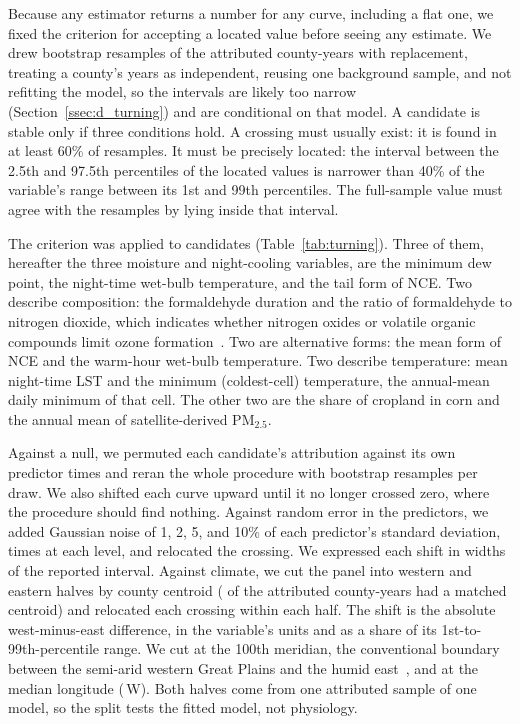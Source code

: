 \documentclass[sensors,article,submit,moreauthors,pdftex]{Definitions/mdpi}
\begin{document}
Because any estimator returns a number for any curve, including a flat one,
we fixed the criterion for accepting a located value before seeing any
estimate. We drew \TpBoot{} bootstrap resamples of the attributed county-years
with replacement, treating a county's years as independent, reusing one background sample, and not refitting the model, so the intervals are likely too narrow (Section~\ref{ssec:d_turning}) and are
conditional on that model. A candidate is stable only if three conditions
hold. A crossing
must usually exist: it is found in at least 60\% of resamples. It must be
precisely located: the interval between the 2.5th and 97.5th percentiles of the
located values is narrower than 40\% of the variable's range between its 1st
and 99th percentiles. The
full-sample value must agree with the resamples by lying inside that interval.

The criterion was applied to \TpTotal{} candidates
(Table~\ref{tab:turning}). Three of them, hereafter the three moisture
and night-cooling variables, are the minimum dew point, the night-time
wet-bulb temperature, and the tail form of NCE. Two describe composition: the
formaldehyde duration and the ratio of formaldehyde to nitrogen dioxide, which
indicates whether nitrogen oxides or volatile organic compounds limit ozone
formation~\cite{Duncan2010}. Two are alternative forms: the mean form of NCE
and the warm-hour wet-bulb temperature. Two describe temperature: mean
night-time LST and the minimum (coldest-cell) temperature, the annual-mean
daily minimum of that cell. The other two are the share of cropland in corn and the annual
mean of satellite-derived PM$_{2.5}$.

Against a null, we permuted each
candidate's attribution against its own predictor \NullCrossDraws{} times and
reran the whole procedure with \NullCrossBoot{} bootstrap resamples per draw.
We also shifted each curve upward until it no longer crossed zero, where the
procedure should find nothing. Against random error in the predictors, we added Gaussian noise of 1,
2, 5, and 10\% of each predictor's standard deviation, \PertDraws{} times at
each level, and relocated the crossing. We expressed each shift in widths of
the reported interval. Against climate, we cut the panel into western and
eastern halves by county centroid (\RegMerMatched{} of the \GateShapN{} attributed
county-years had a matched centroid) and relocated each crossing within each half. The shift is the absolute west-minus-east difference, in the variable's units and as a share of its 1st-to-99th-percentile range. We cut at the
100th meridian, the conventional boundary between the semi-arid western Great
Plains and the humid east~\cite{Seager2018}, and at the median longitude
(\RegMedCut{}\,\textdegree W). Both halves come from one attributed
sample of one model, so the split tests the fitted model, not physiology.
\end{document}
